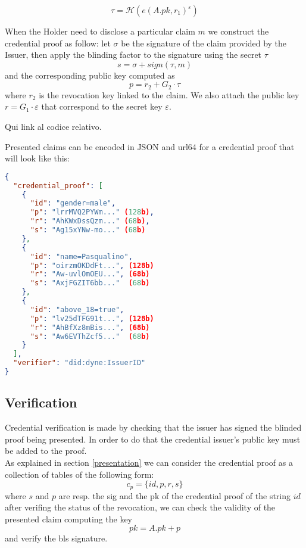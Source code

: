 \documentclass[conference]{IEEEtran}
\begin{document}
\begin{equation}\label{tau_f}
    \tau = \mathcal{H}(e(A.pk, r_1)^{\varepsilon})
\end{equation}

When the Holder need to disclose a particular claim $m$ we construct the credential proof as follow:
let $\sigma$ be the signature of the claim provided by the Issuer, then apply the blinding factor to the signature using the secret $\tau$
\begin{equation}\label{claim.s}
    s = \sigma + sign(\tau, m)
\end{equation}
and the corresponding public key computed as
\begin{equation*}
    p = r_2 + G_2 \cdot \tau
\end{equation*}
where $r_2$ is the revocation key linked to the claim.
We also attach the public key $r = G_1 \cdot \varepsilon$ that correspond to the secret key $\varepsilon$.

Qui link al codice relativo.

Presented claims can be encoded in JSON and url64 for a credential proof that will look like this:

\begin{lstlisting}[language=json,caption={Credential proof}]
{
  "credential_proof": [
    {
      "id": "gender=male",
      "p": "lrrMVQ2PYWm..." (128b),
      "r": "AhKWxDssQzm..." (68b),
      "s": "Ag15xYNw-mo..." (68b)
    },
    {
      "id": "name=Pasqualino",
      "p": "oirzmOKDdFt...", (128b)
      "r": "Aw-uvlOmOEU...", (68b)
      "s": "AxjFGZIT6bb..."  (68b)
    },
    {
      "id": "above_18=true",
      "p": "lv25dTFG91t...", (128b)
      "r": "AhBfXz8mBis...", (68b)
      "s": "Aw6EVThZcf5..."  (68b)
    }
  ],
  "verifier": "did:dyne:IssuerID"
}
\end{lstlisting}

\subsection{Verification}

Credential verification is made by checking that the issuer has signed the blinded proof being presented. In order to do that the credential issuer's public key must be added to the proof.\\
As explained in section \ref{presentation} we can consider the credential proof as a collection of tables of the following form:
\begin{equation*}
    c_p = \{id, p, r, s \}
\end{equation*}
where $s$ and $p$ are resp. the sig and the pk of the credential proof of the string $id$
after verifing the status of the revocation, we can check the validity of the presented claim computing the key
\begin{equation*}
    pk = A.pk + p
\end{equation*}
and verify the bls signature.
\end{document}
